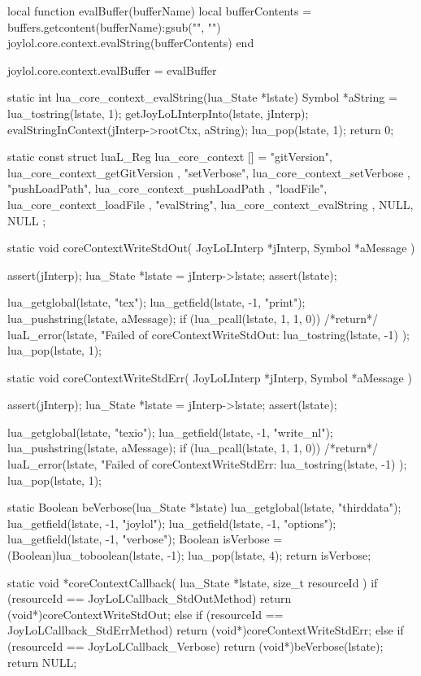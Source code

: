 \startLuaCode
local function evalBuffer(bufferName) 
  local bufferContents =
    buffers.getcontent(bufferName):gsub("", "\n")
  joylol.core.context.evalString(bufferContents)
end

joylol.core.context.evalBuffer = evalBuffer
\stopLuaCode

\startCCode
static int lua_core_context_evalString(lua_State *lstate) {
  Symbol *aString = lua_tostring(lstate, 1);
  getJoyLoLInterpInto(lstate, jInterp);
  evalStringInContext(jInterp->rootCtx, aString);
  lua_pop(lstate, 1);
  return 0;
}
\stopCCode

\startCCode
static const struct luaL_Reg lua_core_context [] = {
  { "gitVersion",   lua_core_context_getGitVersion },
  { "setVerbose",   lua_core_context_setVerbose    },
  { "pushLoadPath", lua_core_context_pushLoadPath  },
  { "loadFile",     lua_core_context_loadFile      },
  { "evalString",   lua_core_context_evalString    },
  {NULL, NULL}
};
\stopCCode

\startCCode
static void coreContextWriteStdOut(
  JoyLoLInterp *jInterp,
  Symbol       *aMessage
) {
  assert(jInterp);
  lua_State *lstate = jInterp->lstate;
  assert(lstate);
  
  lua_getglobal(lstate, "tex");
  lua_getfield(lstate, -1, "print");
  lua_pushstring(lstate, aMessage);
  if (lua_pcall(lstate, 1, 1, 0)) {
    /*return*/ luaL_error(lstate,
      "Failed of coreContextWriteStdOut\nERROR:\n%
      lua_tostring(lstate, -1)
    );
  }
  lua_pop(lstate, 1);
}

static void coreContextWriteStdErr(
  JoyLoLInterp *jInterp,
  Symbol       *aMessage
) {
  assert(jInterp);
  lua_State *lstate = jInterp->lstate;
  assert(lstate);
  
  lua_getglobal(lstate, "texio");
  lua_getfield(lstate, -1, "write_nl");
  lua_pushstring(lstate, aMessage);
  if (lua_pcall(lstate, 1, 1, 0)) {
    /*return*/ luaL_error(lstate,
      "Failed of coreContextWriteStdErr\nERROR:\n%
      lua_tostring(lstate, -1)
    );
  }
  lua_pop(lstate, 1);
}

static Boolean beVerbose(lua_State *lstate) {
  lua_getglobal(lstate, "thirddata");
  lua_getfield(lstate, -1, "joylol");
  lua_getfield(lstate, -1, "options");
  lua_getfield(lstate, -1, "verbose");
  Boolean isVerbose = (Boolean)lua_toboolean(lstate, -1);
  lua_pop(lstate, 4);
  return isVerbose;
}

static void *coreContextCallback(
  lua_State *lstate,
  size_t resourceId
) {
  if (resourceId == JoyLoLCallback_StdOutMethod) {
    return (void*)coreContextWriteStdOut;
  } else if (resourceId == JoyLoLCallback_StdErrMethod) {
    return (void*)coreContextWriteStdErr;
  } else if (resourceId == JoyLoLCallback_Verbose) {
    return (void*)beVerbose(lstate);
  }
  return NULL;
}
\stopCCode


